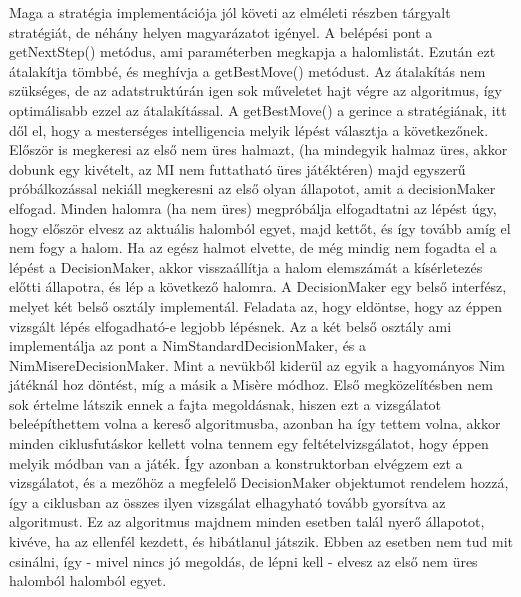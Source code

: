 Maga a stratégia implementációja jól követi az elméleti részben tárgyalt stratégiát, de néhány helyen magyarázatot igényel. \ujsor
A belépési pont a getNextStep() metódus, ami paraméterben megkapja a halomlistát. Ezután ezt átalakítja tömbbé, és meghívja a getBestMove() metódust. Az átalakítás nem szükséges, de az adatstruktúrán igen sok műveletet hajt végre az algoritmus, így optimálisabb ezzel az átalakítással.\ujsor
A getBestMove() a gerince a stratégiának, itt dől el, hogy a mesterséges intelligencia melyik lépést választja a következőnek. Először is megkeresi az első nem üres halmazt, (ha mindegyik halmaz üres, akkor dobunk egy kivételt, az MI nem futtatható üres játéktéren) majd egyszerű próbálkozással nekiáll megkeresni az első olyan állapotot, amit a decisionMaker elfogad. Minden halomra (ha nem üres) megpróbálja elfogadtatni az lépést úgy, hogy először elvesz az aktuális halomból egyet, majd kettőt, és így tovább amíg el nem fogy a halom. Ha az egész halmot elvette, de még mindig nem fogadta el a lépést a DecisionMaker, akkor visszaállítja a halom elemszámát a kísérletezés előtti állapotra, és lép a következő halomra.\ujsor
A DecisionMaker egy belső interfész, melyet két belső osztály implementál. Feladata az, hogy eldöntse, hogy az éppen vizsgált lépés elfogadható-e legjobb lépésnek. Az a két belső osztály ami implementálja az pont a NimStandardDecisionMaker, és a NimMisereDecisionMaker. Mint a nevükből kiderül az egyik a hagyományos Nim játéknál hoz döntést, míg a másik a Misère módhoz. Első megközelítésben nem sok értelme látszik ennek a fajta megoldásnak, hiszen ezt a vizsgálatot beleépíthettem volna a kereső algoritmusba, azonban ha így tettem volna, akkor minden ciklusfutáskor kellett volna tennem egy feltételvizsgálatot, hogy éppen melyik módban van a játék. Így azonban a konstruktorban elvégzem ezt a vizsgálatot, és a mezőhöz a megfelelő DecisionMaker objektumot rendelem hozzá, így a ciklusban az összes ilyen vizsgálat elhagyható tovább gyorsítva az algoritmust.\ujsor
Ez az algoritmus majdnem minden esetben talál nyerő állapotot, kivéve, ha az ellenfél kezdett, és hibátlanul játszik. Ebben az esetben nem tud mit csinálni, így - mivel nincs jó megoldás, de lépni kell - elvesz az első nem üres halomból halomból egyet.



